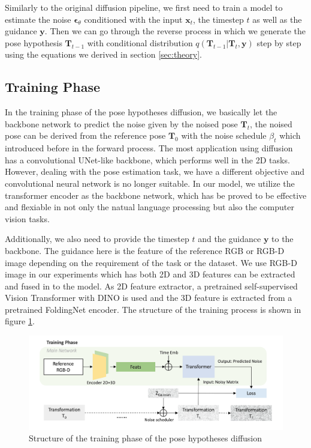 \documentclass[12pt,DIV14,BCOR12mm,a4paper,footinclude=false,headinclude,parskip=half-,twoside,openright,cleardoublepage=empty,toc=index,bibliography=totoc,listof=totoc]{scrreprt}
\numberwithin{equation}{chapter}
\begin{document}
Similarly to the original diffusion pipeline, we first need to train a model to estimate the noise $\boldsymbol{\epsilon}_{\theta}$ conditioned with the input $\mathbf{x}_{t}$, the timestep $t$ as well as the guidance $\mathbf{y}$. Then we can go through the reverse process in which we generate the pose hypothesis $\mathbf{T}_{t-1}$ with conditional distribution $q(\mathbf{T}_{t-1}|\mathbf{T}_{t},\mathbf{y})$ step by step using the equations we derived in section \ref{sec:theory}.
\subsection{Training Phase}
In the training phase of the pose hypotheses diffusion, we basically let the backbone network to predict the noise given by the noised pose $\mathbf{T}_{t}$, the noised pose can be derived from the reference pose $\mathbf{T}_{0}$ with the noise schedule $\beta_{t}$ which introduced before in the forward process. The most application using diffusion has a convolutional UNet-like backbone\cite{ronneberger2015unet}, which performs well in the 2D tasks. However, dealing with the pose estimation task, we have a different objective and convolutional neural network is no longer suitable. In our model, we utilize the transformer encoder as the backbone network, which has be proved to be effective and flexiable in not only the natual language processing but also the computer vision tasks.

Additionally, we also need to provide the timestep $t$ and the guidance $\mathbf{y}$ to the backbone. The guidance here is the feature of the reference RGB or RGB-D image depending on the requirement of the task or the dataset. We use RGB-D image in our experiments which has both 2D and 3D features can be extracted and fused in to the model. As 2D feature extractor, a pretrained self-supervised Vision Transformer
 with DINO\cite{caron2021emerging} is used and the 3D feature is extracted from a pretrained FoldingNet encoder\cite{yang2018foldingnet}. The structure of the training process is shown in figure \ref{img:train}.

\begin{figure}[h]
	\centering
	\includegraphics[scale=.23]{img/train.png}
	\caption{Structure of the training phase of the pose hypotheses diffusion}
	\label{img:train}
\end{figure}
\end{document}
